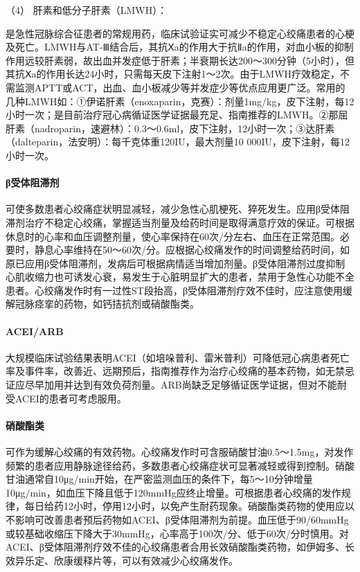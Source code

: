 \hypertarget{text00309.htmlux5cux23CHP10-7-3-2-2-1-4}{}
（4） 肝素和低分子肝素（LMWH）：

是急性冠脉综合征患者的常规用药，临床试验证实可减少不稳定心绞痛患者的心梗及死亡。LMWH与AT-Ⅲ结合后，其抗Ⅹa的作用大于抗Ⅱa的作用，对血小板的抑制作用远较肝素弱，故出血并发症低于肝素；半衰期长达200～300分钟（5小时），但其抗Ⅹa的作用长达24小时，只需每天皮下注射1～2次。由于LMWH疗效稳定，不需监测APTT或ACT，出血、血小板减少等并发症少等优点应用更广泛。常用的几种LMWH如：①伊诺肝素（enoxaparin，克赛）：剂量1mg/kg，皮下注射，每12小时一次；是目前治疗冠心病循证医学证据最充足、指南推荐的LMWH。②那屈肝素（nadroparin，速避林）：0.3～0.6ml，皮下注射，12小时一次；③达肝素（dalteparin，法安明）：每千克体重120IU，最大剂量10
000IU，皮下注射，每12小时一次。

\paragraph{β受体阻滞剂}

可使多数患者心绞痛症状明显减轻，减少急性心肌梗死、猝死发生。应用β受体阻滞剂治疗不稳定心绞痛，掌握适当剂量及给药时间是取得满意疗效的保证。可根据休息时的心率和血压调整剂量，使心率保持在60次/分左右、血压在正常范围。必要时，静息心率维持在50～60次/分。应根据心绞痛发作的时间调整给药时间，如原已应用β受体阻滞剂，发病后可根据病情适当增加剂量。β受体阻滞剂过度抑制心肌收缩力也可诱发心衰，易发生于心脏明显扩大的患者，禁用于急性心功能不全患者。心绞痛发作时有一过性ST段抬高，β受体阻滞剂疗效不佳时，应注意使用缓解冠脉痉挛的药物，如钙拮抗剂或硝酸酯类。

\paragraph{ACEI/ARB}

大规模临床试验结果表明ACEI（如培哚普利、雷米普利）可降低冠心病患者死亡率及事件率，改善近、远期预后，指南推荐作为治疗心绞痛的基本药物，如无禁忌证应尽早加用并达到有效负荷剂量。ARB尚缺乏足够循证医学证据，但对不能耐受ACEI的患者可考虑服用。

\paragraph{硝酸酯类}

可作为缓解心绞痛的有效药物。心绞痛发作时可含服硝酸甘油0.5～1.5mg，对发作频繁的患者应用静脉途径给药，多数患者心绞痛症状可显著减轻或得到控制。硝酸甘油通常自10μg/min开始，在严密监测血压的条件下，每5～10分钟增量10μg/min，如血压下降且低于120mmHg应终止增量。可根据患者心绞痛的发作规律，每日给药12小时，停用12小时，以免产生耐药现象。硝酸酯类药物的使用应以不影响可改善患者预后药物如ACEI、β受体阻滞剂为前提。血压低于90/60mmHg或较基础收缩压下降大于30mmHg，心率高于100次/分、低于60次/分时慎用。对ACEI、β受体阻滞剂疗效不佳的心绞痛患者合用长效硝酸酯类药物，如伊姆多、长效异乐定、欣康缓释片等，可以有效减少心绞痛发作。

